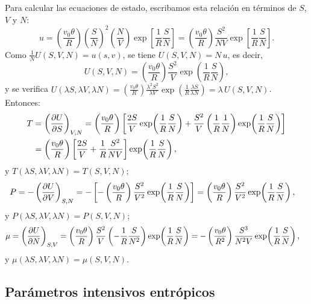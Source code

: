 \begin{solucion}
  Para calcular las ecuaciones de estado, escribamos esta relación en términos de $S$, $V$ y $N$:
  \begin{equation*}
    u=\left(\frac{v_0\theta}{R}\right)\left(\frac{S}{N}\right)^{2}\left(\frac{N}{V}\right)\exp\!\left[\frac{1}{R}\frac{S}{N}\right]
    =\left(\frac{v_0\theta}{R}\right)\frac{S^{2}}{NV}\exp\!\left[\frac{1}{R}\frac{S}{N}\right].
  \end{equation*}
  Como $\frac{1}{N}U(S,V,N)=u(s,v)$, se tiene $U(S,V,N)=N\,u$, es decir,
  \begin{equation*}
    U(S,V,N)=\left(\frac{v_0\theta}{R}\right)\frac{S^{2}}{V}\exp\!\left(\frac{1}{R}\frac{S}{N}\right),
  \end{equation*}
  y se verifica $U(\lambda S,\lambda V,\lambda N)=\left(\frac{v_0\theta}{R}\right)\frac{\lambda^{2}S^{2}}{\lambda V}\exp\!\left(\frac{1}{R}\frac{\lambda S}{\lambda N}\right)=\lambda\,U(S,V,N)$.
  Entonces:
  \begin{align*}
    T&=\left(\frac{\partial U}{\partial S}\right)_{V,N}=\left(\frac{v_0\theta}{R}\right)\left[\frac{2S}{V}\exp\!\left(\frac{1}{R}\frac{S}{N}\right)+\frac{S^{2}}{V}\left(\frac{1}{R}\frac{1}{N}\right)\exp\!\left(\frac{1}{R}\frac{S}{N}\right)\right]\\
     &=\left(\frac{v_0\theta}{R}\right)\left[\frac{2S}{V}+\frac{1}{R}\frac{S^{2}}{NV}\right]\exp\!\left(\frac{1}{R}\frac{S}{N}\right),
  \end{align*}
  y $T(\lambda S,\lambda V,\lambda N)=T(S,V,N)$;
  \begin{align*}
    P&=-\left(\frac{\partial U}{\partial V}\right)_{S,N}=-\left[-\left(\frac{v_0\theta}{R}\right)\frac{S^{2}}{V^{2}}\exp\!\left(\frac{1}{R}\frac{S}{N}\right)\right]
      =\left(\frac{v_0\theta}{R}\right)\frac{S^{2}}{V^{2}}\exp\!\left(\frac{1}{R}\frac{S}{N}\right),
  \end{align*}
  y $P(\lambda S,\lambda V,\lambda N)=P(S,V,N)$;
  \begin{align*}
    \mu&=\left(\frac{\partial U}{\partial N}\right)_{S,V}=\left(\frac{v_0\theta}{R}\right)\frac{S^{2}}{V}\left(-\frac{1}{R}\frac{S}{N^{2}}\right)\exp\!\left(\frac{1}{R}\frac{S}{N}\right)
      =-\left(\frac{v_0\theta}{R^{2}}\right)\frac{S^{3}}{N^{2}V}\exp\!\left(\frac{1}{R}\frac{S}{N}\right),
  \end{align*}
  y $\mu(\lambda S,\lambda V,\lambda N)=\mu(S,V,N)$.
\end{solucion}

\subsection*{Parámetros intensivos entrópicos}

